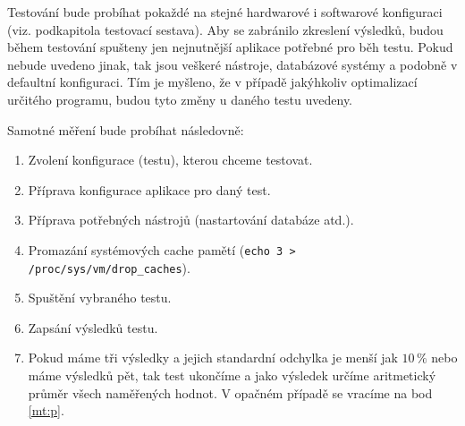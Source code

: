 Testování bude probíhat pokaždé na stejné hardwarové i softwarové konfiguraci (viz. podkapitola testovací sestava). Aby se zabránilo zkreslení výsledků, budou během testování spušteny jen nejnutnější aplikace potřebné pro běh testu. Pokud nebude uvedeno jinak, tak jsou veškeré nástroje, databázové systémy a podobně v defaultní konfiguraci. Tím je myšleno, že v případě jakýhkoliv optimalizací určitého programu, budou tyto změny u daného testu uvedeny.

Samotné měření bude probíhat následovně:
\begin{enumerate}
  \item Zvolení konfigurace (testu), kterou chceme testovat.
  \item Příprava konfigurace aplikace pro daný test.
  \item Příprava potřebných nástrojů (nastartování databáze atd.).
  \item Promazání systémových cache pamětí (\texttt{echo 3 > /proc/sys/vm/drop\_caches}).\label{mt:p}
  \item Spuštění vybraného testu.
  \item Zapsání výsledků testu.
  \item Pokud máme tři výsledky a jejich standardní odchylka je menší jak $10\,\%$ nebo máme výsledků pět, tak test ukončíme a jako výsledek určíme aritmetický průměr všech naměřených hodnot. V opačném případě se vracíme na bod \ref{mt:p}.
\end{enumerate}
